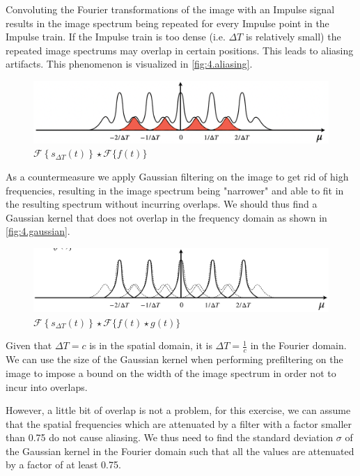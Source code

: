\documentclass[tikz,14pt,fleqn]{article}
\begin{document}
Convoluting the Fourier transformations of the image with an Impulse signal results in the image spectrum being repeated for every Impulse point in the Impulse train. If the Impulse train is too dense (i.e. $\Delta T$ is relatively small) the repeated image spectrums may overlap in certain positions. This leads to aliasing artifacts. This phenomenon is visualized in \autoref{fig:4.aliasing}.
\begin{figure}[H]
    \centering
    \includegraphics[width=0.8\linewidth]{fig/3.aliasing.png}
    \caption{$\mathscr{F}\left\{s_{\Delta T}(t)\right\} \star \mathscr{F}\{f(t)\}$}
    \label{fig:4.aliasing}
\end{figure}
As a countermeasure we apply Gaussian filtering on the image to get rid of high frequencies, resulting in the image spectrum being "narrower" and able to fit in the resulting spectrum without incurring overlaps.
We should thus find a Gaussian kernel that does not overlap in the frequency domain as shown in \autoref{fig:4.gaussian}.
\begin{figure}[H]
    \centering
    \includegraphics[width=0.8\linewidth]{fig/3.aliasing_gaussians.png}
    \caption{$\mathscr{F}\left\{s_{\Delta T}(t)\right\} \star \mathscr{F}\{f(t)\star g(t)\}$}
    \label{fig:4.gaussian}
\end{figure}


Given that $\Delta T = c$ is in the spatial domain, it is $\Delta T = \frac{1}{c}$ in the Fourier domain. We can use the size of the Gaussian kernel when performing prefiltering on the image to impose a bound on the width of the image spectrum in order not to incur into overlaps. 

However, a little bit of overlap is not a problem, for this exercise, we can assume that the spatial frequencies which are attenuated by a filter with a factor smaller than 0.75 do not cause aliasing.
We thus need to find the standard deviation $\sigma$ of the Gaussian kernel in the Fourier domain such that all the values are attenuated by a factor of at least 0.75.
\end{document}
